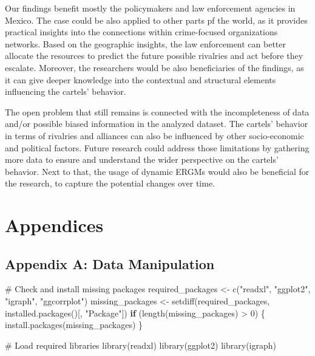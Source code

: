\documentclass[
]{article}
\newenvironment{Shaded}{\begin{snugshade}}{\end{snugshade}}
\newcommand{\CommentTok}[1]{\textcolor[rgb]{0.37,0.37,0.37}{#1}}
\newcommand{\ControlFlowTok}[1]{\textcolor[rgb]{0.00,0.23,0.31}{\textbf{#1}}}
\newcommand{\DecValTok}[1]{\textcolor[rgb]{0.68,0.00,0.00}{#1}}
\newcommand{\FunctionTok}[1]{\textcolor[rgb]{0.28,0.35,0.67}{#1}}
\newcommand{\NormalTok}[1]{\textcolor[rgb]{0.00,0.23,0.31}{#1}}
\newcommand{\OtherTok}[1]{\textcolor[rgb]{0.00,0.23,0.31}{#1}}
\newcommand{\SpecialCharTok}[1]{\textcolor[rgb]{0.37,0.37,0.37}{#1}}
\newcommand{\StringTok}[1]{\textcolor[rgb]{0.13,0.47,0.30}{#1}}
\begin{document}
Our findings benefit mostly the policymakers and law enforcement
agencies in Mexico. The case could be also applied to other parts pf the
world, as it provides practical insights into the connections within
crime-focused organizations networks. Based on the geographic insights,
the law enforcement can better allocate the resources to predict the
future possible rivalries and act before they escalate. Moreover, the
researchers would be also beneficiaries of the findings, as it can give
deeper knowledge into the contextual and structural elements influencing
the cartels' behavior.

The open problem that still remains is connected with the incompleteness
of data and/or possible biased information in the analyzed dataset. The
cartels' behavior in terms of rivalries and alliances can also be
influenced by other socio-economic and political factors. Future
research could address those limitations by gathering more data to
ensure and understand the wider perspective on the cartels' behavior.
Next to that, the usage of dynamic ERGMs would also be beneficial for
the research, to capture the potential changes over time.

\section{Appendices}\label{appendices}

\subsection{Appendix A: Data
Manipulation}\label{appendix-a-data-manipulation}

\begin{Shaded}
\begin{Highlighting}[]
\CommentTok{\# Check and install missing packages}
\NormalTok{required\_packages }\OtherTok{\textless{}{-}} \FunctionTok{c}\NormalTok{(}\StringTok{"readxl"}\NormalTok{, }\StringTok{"ggplot2"}\NormalTok{, }\StringTok{"igraph"}\NormalTok{, }\StringTok{"ggcorrplot"}\NormalTok{)}
\NormalTok{missing\_packages }\OtherTok{\textless{}{-}} \FunctionTok{setdiff}\NormalTok{(required\_packages, }\FunctionTok{installed.packages}\NormalTok{()[, }\StringTok{"Package"}\NormalTok{])}
\ControlFlowTok{if}\NormalTok{ (}\FunctionTok{length}\NormalTok{(missing\_packages) }\SpecialCharTok{\textgreater{}} \DecValTok{0}\NormalTok{) \{}
  \FunctionTok{install.packages}\NormalTok{(missing\_packages)}
\NormalTok{\}}

\CommentTok{\# Load required libraries}
\FunctionTok{library}\NormalTok{(readxl)}
\FunctionTok{library}\NormalTok{(ggplot2)}
\FunctionTok{library}\NormalTok{(igraph)}
\end{Highlighting}
\end{Shaded}
\end{document}
